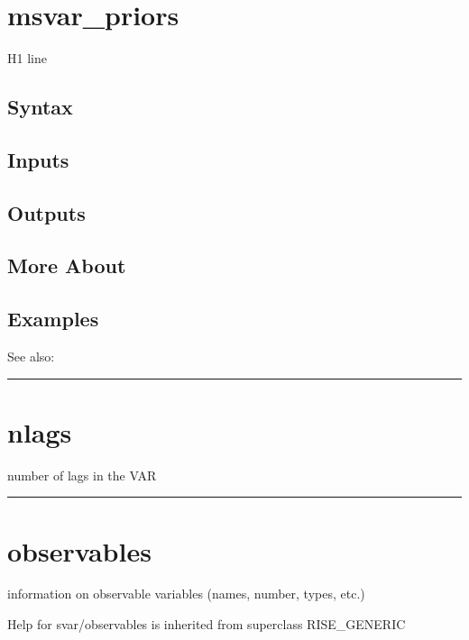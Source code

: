 \documentclass[letterpaper,10pt,english]{sphinxmanual}
\begin{document}
\section{msvar\_priors}
\label{classes/models/@svar/svar:msvar-priors}\label{classes/models/@svar/svar:id74}
H1 line


\subsection{Syntax}
\label{classes/models/@svar/svar:id75}

\subsection{Inputs}
\label{classes/models/@svar/svar:id76}

\subsection{Outputs}
\label{classes/models/@svar/svar:id77}

\subsection{More About}
\label{classes/models/@svar/svar:id78}

\subsection{Examples}
\label{classes/models/@svar/svar:id79}
See also:


\bigskip\hrule{}\bigskip



\section{nlags}
\label{classes/models/@svar/svar:id80}\label{classes/models/@svar/svar:nlags}
number of lags in the VAR


\bigskip\hrule{}\bigskip



\section{observables}
\label{classes/models/@svar/svar:observables}\label{classes/models/@svar/svar:id81}
information on observable variables (names, number, types, etc.)

Help for svar/observables is inherited from superclass RISE\_GENERIC
\end{document}

